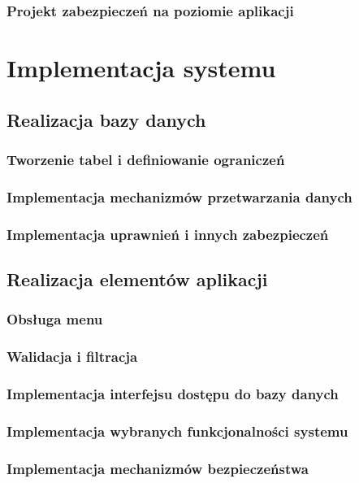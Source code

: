 \documentclass[a4paper, 12pt]{article}
\begin{document}
\subsubsection{Projekt zabezpieczeń na poziomie aplikacji}

\section{Implementacja systemu}
\subsection{Realizacja bazy danych}
\subsubsection{Tworzenie tabel i definiowanie ograniczeń}
\subsubsection{Implementacja mechanizmów przetwarzania danych}
\subsubsection{Implementacja uprawnień i innych zabezpieczeń}

\subsection{Realizacja elementów aplikacji}
\subsubsection{Obsługa menu}
\subsubsection{Walidacja i filtracja}
\subsubsection{Implementacja interfejsu dostępu do bazy danych}
\subsubsection{Implementacja wybranych funkcjonalności systemu}
\subsubsection{Implementacja mechanizmów bezpieczeństwa}
\end{document}
